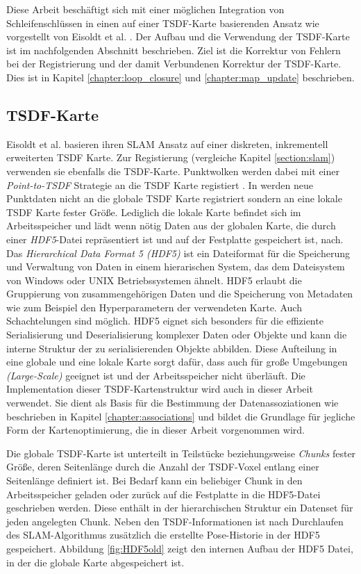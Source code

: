 Diese Arbeit beschäftigt sich mit einer möglichen Integration von Schleifenschlüssen in einen auf einer TSDF-Karte basierenden Ansatz wie vorgestellt von Eisoldt et al. \cite{HATSDF}. Der Aufbau und die Verwendung der TSDF-Karte ist im nachfolgenden Abschnitt beschrieben. Ziel ist die Korrektur von Fehlern bei der Registrierung und der damit Verbundenen Korrektur der TSDF-Karte. Dies ist in Kapitel \ref{chapter:loop_closure} und \ref{chapter:map_update} beschrieben.

\subsection{TSDF-Karte}
\label{section:tsdf_map}

Eisoldt et al. \cite{HATSDF} basieren ihren SLAM Ansatz auf einer diskreten, inkrementell erweiterten TSDF Karte. Zur Registierung (vergleiche Kapitel \ref{section:slam}) verwenden sie ebenfalls die TSDF-Karte. Punktwolken werden dabei mit einer \emph{Point-to-TSDF} Strategie an die TSDF Karte registiert \cite{HATSDF}.
In \cite{HATSDF} werden neue Punktdaten nicht an die globale TSDF Karte registriert sondern an eine lokale TSDF Karte fester Größe. Lediglich die lokale Karte befindet sich im Arbeitsspeicher und lädt wenn nötig Daten aus der globalen Karte, die durch einer \emph{HDF5}-Datei repräsentiert ist und auf der Festplatte gespeichert ist, nach. Das \emph{Hierarchical Data Format 5 (HDF5)} \cite{hdf5} ist ein Dateiformat für die Speicherung und Verwaltung von Daten in einem hierarischen System, das dem Dateisystem von Windows oder UNIX Betriebssystemen ähnelt. HDF5 erlaubt die Gruppierung von zusammengehörigen Daten und die Speicherung von Metadaten wie zum Beispiel den Hyperparametern der verwendeten Karte. Auch Schachtelungen sind möglich. HDF5 eignet sich besonders für die effiziente Serialisierung und Deserialisierung komplexer Daten oder Objekte und kann die interne Struktur der zu serialisierenden Objekte abbilden.
Diese Aufteilung in eine globale und eine lokale Karte sorgt dafür, dass \cite{HATSDF} auch für große Umgebungen \emph{(Large-Scale)} geeignet ist und der Arbeitsspeicher nicht überläuft. Die Implementation dieser TSDF-Kartenstruktur wird auch in dieser Arbeit verwendet. Sie dient als Basis für die Bestimmung der Datenassoziationen wie beschrieben in Kapitel \ref{chapter:associations} und bildet die Grundlage für jegliche Form der Kartenoptimierung, die in dieser Arbeit vorgenommen wird.

Die globale TSDF-Karte ist unterteilt in Teilstücke beziehungsweise \emph{Chunks} fester Größe, deren Seitenlänge durch die Anzahl der TSDF-Voxel entlang einer Seitenlänge definiert ist. Bei Bedarf kann ein beliebiger Chunk in den Arbeitsspeicher geladen oder zurück auf die Festplatte in die HDF5-Datei geschrieben werden. Diese enthält in der hierarchischen Struktur ein Datenset für jeden angelegten Chunk. Neben den TSDF-Informationen ist nach Durchlaufen des SLAM-Algorithmus zusätzlich die erstellte Pose-Historie in der HDF5 gespeichert.
Abbildung \ref{fig:HDF5old} zeigt den internen Aufbau der HDF5 Datei, in der die globale Karte abgespeichert ist.

